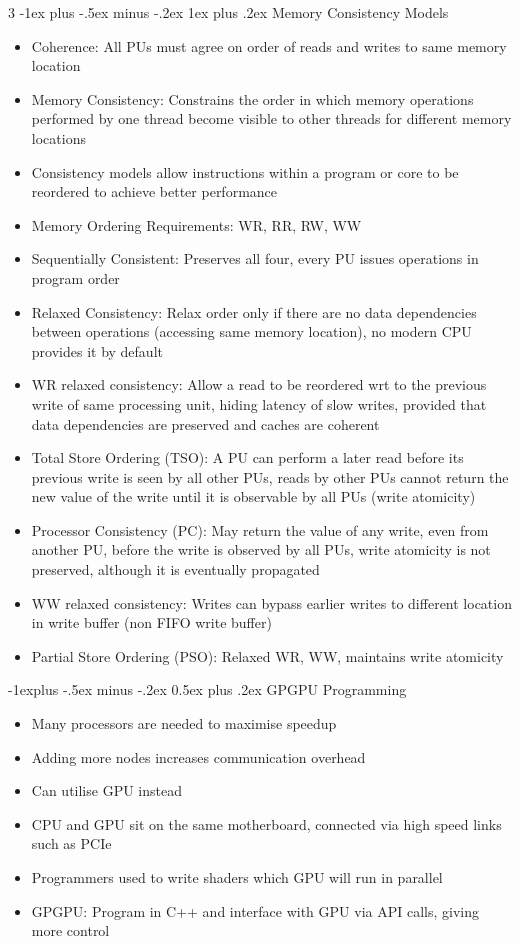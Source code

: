 \documentclass[10pt, landscape]{article}
\makeatletter
\renewcommand{\section}{\@startsection{section}{1}{0mm}%
                                {-1ex plus -.5ex minus -.2ex}%
                                {0.5ex plus .2ex}%
                                {\normalfont\large\bfseries}}
\renewcommand{\section}{\@startsection{section}{2}{0mm}%
                                {-1explus -.5ex minus -.2ex}%
                                {0.5ex plus .2ex}%
                                {\normalfont\normalsize\bfseries}}
\renewcommand{\subsection}{\@startsection{subsection}{3}{0mm}%
                                {-1ex plus -.5ex minus -.2ex}%
                                {1ex plus .2ex}%
                                {\normalfont\small\bfseries}}%
\makeatother
\begin{document}
\begin{multicols*}{3}
\subsection{Memory Consistency Models}
\begin{itemize}
    \item Coherence: All PUs must agree on order of reads and writes to same memory location
    \item Memory Consistency: Constrains the order in which memory operations performed by one thread become visible to other threads for different memory locations
    \item Consistency models allow instructions within a program or core to be reordered to achieve better performance
    \item Memory Ordering Requirements: WR, RR, RW, WW
    \item Sequentially Consistent: Preserves all four, every PU issues operations in program order
    \item Relaxed Consistency: Relax order only if there are no data dependencies between operations (accessing same memory location), no modern CPU provides it by default
    \item WR relaxed consistency: Allow a read to be reordered wrt to the previous write of same processing unit, hiding latency of slow writes, provided that data dependencies are preserved and caches are coherent
    \item Total Store Ordering (TSO): A PU can perform a later read before its previous write is seen by all other PUs, reads by other PUs cannot return the new value of the write until it is observable by all PUs (write atomicity)
    \item Processor Consistency (PC): May return the value of any write, even from another PU, before the write is observed by all PUs, write atomicity is not preserved, although it is eventually propagated
    \item WW relaxed consistency: Writes can bypass earlier writes to different location in write buffer (non FIFO write buffer)
    \item Partial Store Ordering (PSO): Relaxed WR, WW, maintains write atomicity
\end{itemize}

\section{GPGPU Programming}
\begin{itemize}
    \item Many processors are needed to maximise speedup
    \item Adding more nodes increases communication overhead
    \item Can utilise GPU instead
    \item CPU and GPU sit on the same motherboard, connected via high speed links such as PCIe
    \item Programmers used to write shaders which GPU will run in parallel
    \item GPGPU: Program in C++ and interface with GPU via API calls, giving more control
\end{itemize}


\end{multicols*}
\end{document}
